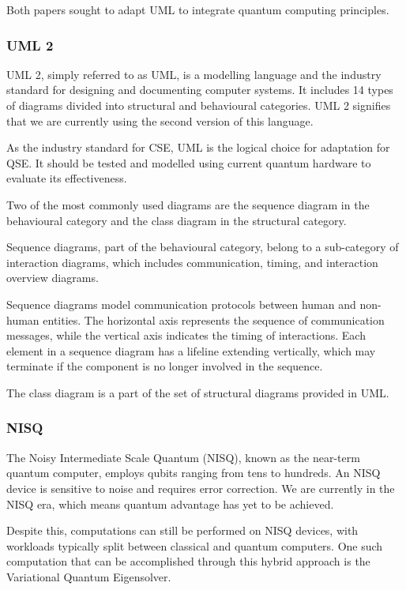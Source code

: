 \documentclass{article}
\newcounter{subsubsubsection}[subsubsection]
\begin{document}
Both papers sought to adapt UML to integrate quantum computing principles. 

\subsubsection{UML 2}

UML 2, simply referred to as UML, is a modelling language and the industry standard for designing and documenting computer systems. It includes 14 types of diagrams divided into structural and behavioural categories. UML 2 signifies that we are currently using the second version of this language. 

As the industry standard for CSE, UML is the logical choice for adaptation for QSE. It should be tested and modelled using current quantum hardware to evaluate its effectiveness. 

Two of the most commonly used diagrams are the sequence diagram in the behavioural category and the class diagram in the structural category.


Sequence diagrams, part of the behavioural category, belong to a sub-category of interaction diagrams, which includes communication, timing, and interaction overview diagrams.

Sequence diagrams model communication protocols between human and non-human entities. The horizontal axis represents the sequence of communication messages, while the vertical axis indicates the timing of interactions. Each element in a sequence diagram has a lifeline extending vertically, which may terminate if the component is no longer involved in the sequence. 


The class diagram is a part of the set of structural diagrams provided in UML. 

\subsubsection{NISQ}

The Noisy Intermediate Scale Quantum (NISQ), known as the near-term quantum computer, employs qubits ranging from tens to hundreds. An NISQ device is sensitive to noise and requires error correction. We are currently in the NISQ era, which means quantum advantage has yet to be achieved.

Despite this, computations can still be performed on NISQ devices, with workloads typically split between classical and quantum computers. One such computation that can be accomplished through this hybrid approach is the Variational Quantum Eigensolver. 
\end{document}
